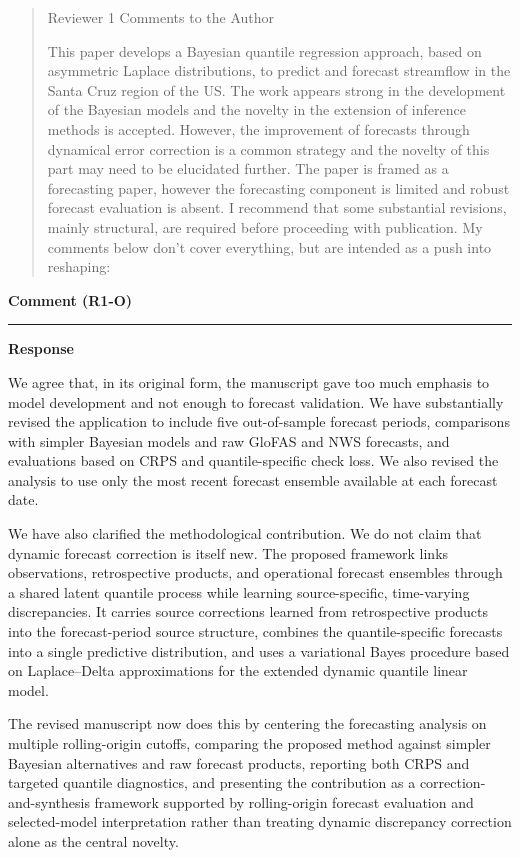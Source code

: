 \documentclass[11pt,letterpaper]{article}
\newcommand{\commentheading}[1]{%
  \vspace{6pt}\noindent\textbf{Comment (#1)}\par
  \vspace{2pt}\hrule\vspace{6pt}
}
\newenvironment{commentblock}{\begin{quote}\small\itshape}{\end{quote}}
\newcommand{\responseheading}{%
  \vspace{2pt}\noindent\textbf{Response}\par
}
\newenvironment{responsebox}{\begin{mdframed}[style=plainbox]}{\end{mdframed}}
\newcommand{\RoneO}{R1-O}
\begin{document}
\begin{commentblock}

Reviewer 1 Comments to the Author

This paper develops a Bayesian quantile regression approach, based on asymmetric Laplace distributions, to predict and forecast streamflow in the Santa Cruz region of the US. The work appears strong in the development of the Bayesian models and the novelty in the extension of inference methods is accepted. However, the improvement of forecasts through dynamical error correction is a common strategy and the novelty of this part may need to be elucidated further. The paper is framed as a forecasting paper, however the forecasting component is limited and robust forecast evaluation is absent. I recommend that some substantial revisions, mainly structural, are required before proceeding with publication. My comments below don’t cover everything, but are intended as a push into reshaping:
\end{commentblock}
\commentheading{\RoneO}
\responseheading
\begin{responsebox}
We agree that, in its original form, the manuscript gave too much emphasis to model development and not enough to forecast validation. We have substantially revised the application to include five out-of-sample forecast periods, comparisons with simpler Bayesian models and raw GloFAS and NWS forecasts, and evaluations based on CRPS and quantile-specific check loss. We also revised the analysis to use only the most recent forecast ensemble available at each forecast date.


We have also clarified the methodological contribution. We do not claim that dynamic forecast correction is itself new. The proposed framework links observations, retrospective products, and operational forecast ensembles through a shared latent quantile process while learning source-specific, time-varying discrepancies. It carries source corrections learned from retrospective products into the forecast-period source structure, combines the quantile-specific forecasts into a single predictive distribution, and uses a variational Bayes procedure based on Laplace--Delta approximations for the extended dynamic quantile linear model.

The revised manuscript now does this by centering the forecasting analysis on multiple rolling-origin cutoffs, comparing the proposed method against simpler Bayesian alternatives and raw forecast products, reporting both CRPS and targeted quantile diagnostics, and presenting the contribution as a correction-and-synthesis framework supported by rolling-origin forecast evaluation and selected-model interpretation rather than treating dynamic discrepancy correction alone as the central novelty.
\end{responsebox}
\end{document}
